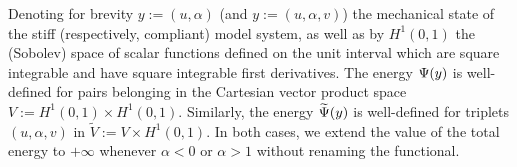 
Denoting for brevity $y:=(u, \alpha)$ (and $y:=(u, \alpha, v)$) the mechanical state of the stiff (respectively, compliant) model system, as well as by $H^1(0, 1)$ the (Sobolev) space of scalar functions defined on the unit interval which are square integrable and have square integrable first derivatives. The energy $\Psi(y)$ is well-defined for pairs belonging in the Cartesian vector product space $V:=H^1(0,1)\times  H^1(0,1)$. Similarly, the energy $\widetilde\Psi(y)$ is well-defined for triplets $(u, \alpha, v)$ in $\widetilde V:=V\times  H^1(0,1)$. In both cases, we extend the value of the total energy to $+\infty$ whenever $\alpha < 0$ or $\alpha > 1$ without renaming the functional.









